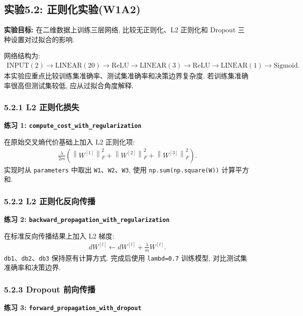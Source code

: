 \documentclass{../../nndlcourse}
\begin{document}
\subsection*{实验5.2: 正则化实验(W1A2)}

\textbf{实验目标: }在二维数据上训练三层网络, 比较无正则化、L2 正则化和 Dropout 三种设置对过拟合的影响.

网络结构为:
\begin{align}
    \mathrm{INPUT}(2)\to\mathrm{LINEAR}(20)\to\mathrm{ReLU}\to
    \mathrm{LINEAR}(3)\to\mathrm{ReLU}\to
    \mathrm{LINEAR}(1)\to\mathrm{Sigmoid}.
\end{align}
本实验应重点比较训练集准确率、测试集准确率和决策边界复杂度. 若训练集准确率很高但测试集较低, 应从过拟合角度解释.

\subsubsection*{5.2.1 L2 正则化损失}

\textbf{练习 1: \texttt{compute\_cost\_with\_regularization}}

在原始交叉熵代价基础上加入 L2 正则化项:
\begin{align}
    \frac{\lambda}{2m}
    \left(
    \left\|W^{[1]}\right\|_F^2+
    \left\|W^{[2]}\right\|_F^2+
    \left\|W^{[3]}\right\|_F^2
    \right).
\end{align}
实现时从 \texttt{parameters} 中取出 \texttt{W1}、\texttt{W2}、\texttt{W3}, 使用 \texttt{np.sum(np.square(W))} 计算平方和.

\subsubsection*{5.2.2 L2 正则化反向传播}

\textbf{练习 2: \texttt{backward\_propagation\_with\_regularization}}

在标准反向传播结果上加入 L2 梯度:
\begin{align}
    dW^{[l]} \leftarrow dW^{[l]}+\frac{\lambda}{m}W^{[l]}.
\end{align}
\texttt{db1}、\texttt{db2}、\texttt{db3} 保持原有计算方式. 完成后使用 \texttt{lambd=0.7} 训练模型, 对比测试集准确率和决策边界.

\subsubsection*{5.2.3 Dropout 前向传播}

\textbf{练习 3: \texttt{forward\_propagation\_with\_dropout}}
\end{document}
